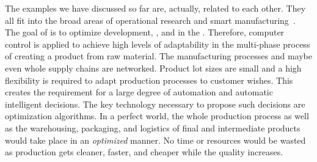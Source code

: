 %
%
The examples we have discussed so far are, actually, related to each other.
They all fit into the broad areas of operational research and smart manufacturing~\cite{DEPBS2012SMMIADDP,HPO2016DPFI4S}.
The goal of  is to optimize development, , and  in the .
Therefore, computer control is applied to achieve high levels of adaptability in the multi-phase process of creating a product from raw material.
The manufacturing processes and maybe even whole supply chains are networked.
Product lot sizes are small and a high flexibility is required to adapt production processes to customer wishes.
This creates the requirement for a large degree of automation and automatic intelligent decisions.
The key technology necessary to propose such decisions are optimization algorithms.
In a perfect world, the whole production process as well as the warehousing, packaging, and logistics of final and intermediate products would take place in an \emph{optimized} manner.
No time or resources would be wasted as production gets cleaner, faster, and cheaper while the quality increases.%
%
\endhsection%
%

